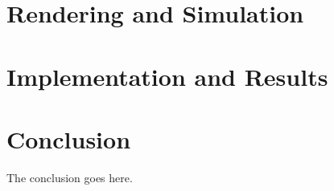 \documentclass[10pt,journal,compsoc]{IEEEtran}
\begin{document}
\section{Rendering and Simulation}\label{sec:render}



\section{Implementation and Results}

\section{Conclusion}
The conclusion goes here.






%


%
\end{document}
